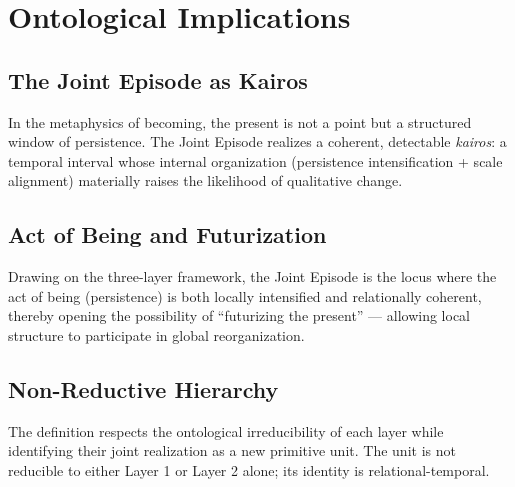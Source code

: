 \section{Ontological Implications}

\subsection{The Joint Episode as Kairos}

In the metaphysics of becoming, the present is not a point but a structured window of persistence. The Joint Episode realizes a coherent, detectable \textit{kairos}: a temporal interval whose internal organization (persistence intensification + scale alignment) materially raises the likelihood of qualitative change.

\subsection{Act of Being and Futurization}

Drawing on the three-layer framework, the Joint Episode is the locus where the act of being (persistence) is both locally intensified and relationally coherent, thereby opening the possibility of “futurizing the present” — allowing local structure to participate in global reorganization.

\subsection{Non-Reductive Hierarchy}

The definition respects the ontological irreducibility of each layer while identifying their joint realization as a new primitive unit. The unit is not reducible to either Layer 1 or Layer 2 alone; its identity is relational-temporal.
